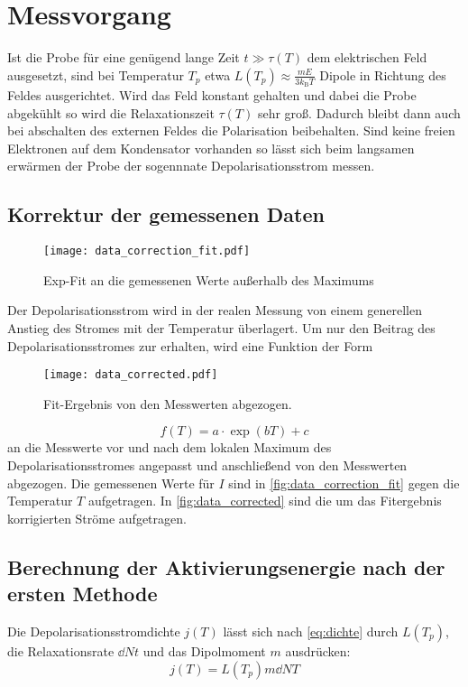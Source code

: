 \section{Messvorgang}
\label{sec:messvorgang}

Ist die Probe für eine genügend lange Zeit $t \gg τ(T)$ dem elektrischen Feld ausgesetzt,
sind bei Temperatur $T_p$ etwa $L(T_p) \approx \frac{m E}{3 k_\text{B} T}$ Dipole in Richtung des Feldes ausgerichtet.
Wird das Feld konstant gehalten und dabei die Probe abgekühlt so wird die Relaxationszeit $τ(T)$ sehr groß.
Dadurch bleibt dann auch bei abschalten des externen Feldes die Polarisation beibehalten.
Sind keine freien Elektronen auf dem Kondensator vorhanden so lässt sich beim langsamen erwärmen der Probe der sogennnate Depolarisationsstrom messen.

\subsection{Korrektur der gemessenen Daten}
\begin{figure}
  \centering
  \texttt{[image: data\_correction\_fit.pdf]}
  \caption{Exp-Fit an die gemessenen Werte außerhalb des Maximums}
  \label{fig:data_correction_fit}
\end{figure}

Der Depolarisationsstrom wird in der realen Messung von einem generellen
Anstieg des Stromes mit der Temperatur überlagert.
Um nur den Beitrag des Depolarisationsstromes zur erhalten,
wird eine Funktion der Form

\begin{figure}
  \centering
  \texttt{[image: data\_corrected.pdf]}
  \caption{Fit-Ergebnis von den Messwerten abgezogen.}
  \label{fig:data_corrected}
\end{figure}
\begin{equation}
    f(T) = a \cdot \exp(b  T) + c
\end{equation}
an die Messwerte vor und nach dem lokalen Maximum des Depolarisationsstromes angepasst und anschließend von den
Messwerten abgezogen.
Die gemessenen Werte für $I$ sind in \autoref{fig:data_correction_fit} 
gegen die Temperatur $T$ aufgetragen.
In \autoref{fig:data_corrected} sind die um das Fitergebnis korrigierten Ströme aufgetragen.

\subsection{Berechnung der Aktivierungsenergie nach der ersten Methode}
Die Depolarisationsstromdichte $j(T)$ lässt sich nach \eqref{eq:dichte} durch $L(T_p)$, die Relaxationsrate
$\dd{N}{t}$ und das Dipolmoment $m$ ausdrücken:
\begin{equation}
  \label{eq:strom}
  j(T) = L(T_p) m \dd{N}{T}
\end{equation}


